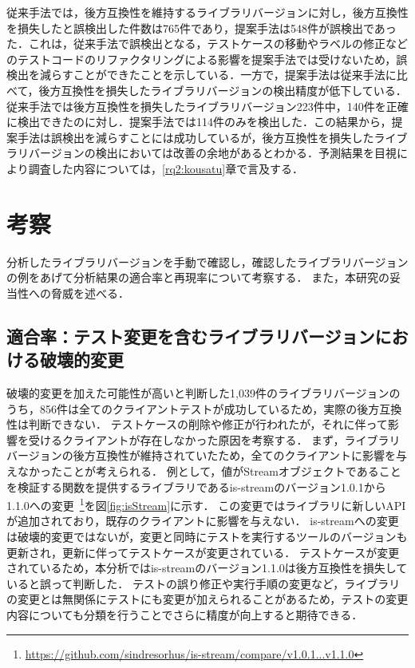 \documentclass[submit]{ipsj}
\begin{document}
従来手法では，後方互換性を維持するライブラリバージョンに対し，後方互換性を損失したと誤検出した件数は765件であり，提案手法は548件が誤検出であった．これは，従来手法で誤検出となる，テストケースの移動やラベルの修正などのテストコードのリファクタリングによる影響を提案手法では受けないため，誤検出を減らすことができたことを示している．一方で，提案手法は従来手法に比べて，後方互換性を損失したライブラリバージョンの検出精度が低下している．従来手法では後方互換性を損失したライブラリバージョン223件中，140件を正確に検出できたのに対し．提案手法では114件のみを検出した．この結果から，提案手法は誤検出を減らすことには成功しているが，後方互換性を損失したライブラリバージョンの検出においては改善の余地があるとわかる．予測結果を目視により調査した内容については，\ref{rq2:kousatu}章で言及する．

\section{考察}
\label{sec:discussion}
分析したライブラリバージョンを手動で確認し，確認したライブラリバージョンの例をあげて分析結果の適合率と再現率について考察する．
また，本研究の妥当性への脅威を述べる．

\subsection{適合率：テスト変更を含むライブラリバージョンにおける破壊的変更}
破壊的変更を加えた可能性が高いと判断した1,039件のライブラリバージョンのうち，856件は全てのクライアントテストが成功しているため，実際の後方互換性は判断できない．
テストケースの削除や修正が行われたが，それに伴って影響を受けるクライアントが存在しなかった原因を考察する．
まず，ライブラリバージョンの後方互換性が維持されていたため，全てのクライアントに影響を与えなかったことが考えられる．
例として，値がStreamオブジェクトであることを検証する関数を提供するライブラリであるis-streamのバージョン1.0.1から1.1.0への変更~\footnote{\url{https://github.com/sindresorhus/is-stream/compare/v1.0.1...v1.1.0}}を図\ref{fig:isStream}に示す．
この変更ではライブラリに新しいAPIが追加されており，既存のクライアントに影響を与えない．
is-streamへの変更は破壊的変更ではないが，変更と同時にテストを実行するツールのバージョンも更新され，更新に伴ってテストケースが変更されている．
テストケースが変更されているため，本分析ではis-streamのバージョン1.1.0は後方互換性を損失していると誤って判断した．
テストの誤り修正や実行手順の変更など，ライブラリの変更とは無関係にテストにも変更が加えられることがあるため，テストの変更内容についても分類を行うことでさらに精度が向上すると期待できる．
\end{document}
